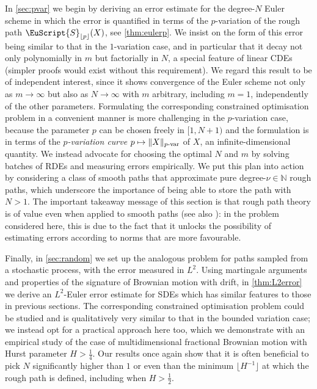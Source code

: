\documentclass{article}
\newcommand{\var}[1]{{#1 \mathchar"2D \mathrm{var}}}
\def\Sig{\EuScript{S}}
\def\p{{\lfloor p \rfloor}}
\numberwithin{equation}{section}
\theoremstyle{definition}
\theoremstyle{remark}
\begin{document}
In \autoref{sec:pvar} we begin by deriving an error estimate for the degree-$N$ Euler scheme in which the error is quantified in terms of the $p$-variation of the rough path $\Sig_\p(X)$, see \autoref{thm:eulerp}. We insist on the form of this error being similar to that in the $1$-variation case, and in particular that it decay not only polynomially in $m$ but factorially in $N$, a special feature of linear CDEs (simpler proofs would exist without this requirement). We regard this result to be of independent interest, since it shows convergence of the Euler scheme not only as $m \to \infty$ but also as $N \to \infty$ with $m$ arbitrary, including $m = 1$, independently of the other parameters. Formulating the corresponding constrained optimisation problem in a convenient manner is more challenging in the $p$-variation case, because the parameter $p$ can be chosen freely in $[1,N+1)$ and the formulation is in terms of the \emph{$p$-variation curve} $p \mapsto \|X\|_{\var{p}}$ of $X$, an infinite-dimensional quantity. We instead advocate for choosing the optimal $N$ and $m$ by solving batches of RDEs and measuring errors empirically. We put this plan into action by considering a class of smooth paths that approximate pure degree-$\nu \in \mathbb N$ rough paths, which underscore the importance of being able to store the path with $N > 1$. The important takeaway message of this section is that rough path theory is of value even when applied to smooth paths (see also \cite{BFPP22, maud2}): in the problem considered here, this is due to the fact that it unlocks the possibility of estimating errors according to norms that are more favourable.

Finally, in \autoref{sec:random} we set up the analogous problem for paths sampled from a stochastic process, with the error measured in $L^2$. Using martingale arguments and properties of the signature of Brownian motion with drift, in \autoref{thm:L2error} we derive an $L^2$-Euler error estimate for SDEs which has similar features to those in previous sections. The corresponding constrained optimisation problem could be studied and is qualitatively very similar to that in the bounded variation case; we instead opt for a practical approach here too, which we demonstrate with an empirical study of the case of multidimensional fractional Brownian motion with Hurst parameter $H > \frac 14$. Our results once again show that it is often beneficial to pick $N$ significantly higher than $1$ or even than the minimum $\lfloor H^{-1} \rfloor$ at which the rough path is defined, including when $H > \frac 12$.
\end{document}
